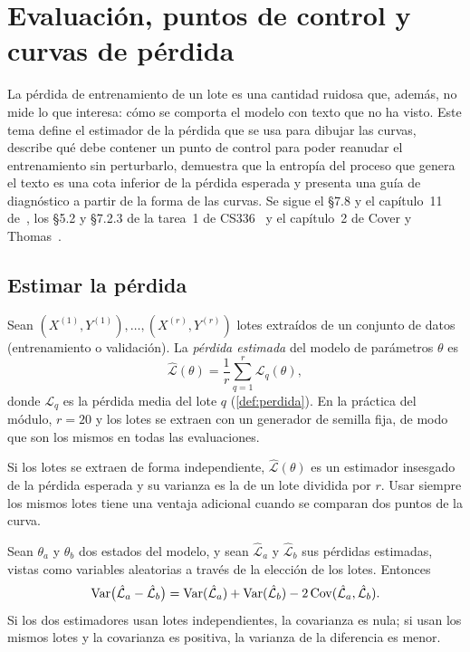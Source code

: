 \chapter{Evaluación, puntos de control y curvas de pérdida}
\label{tema:4}

La pérdida de entrenamiento de un lote es una cantidad ruidosa que, además, no mide lo que interesa: cómo se comporta el modelo con texto que no ha visto. Este tema define el estimador de la pérdida que se usa para dibujar las curvas, describe qué debe contener un punto de control para poder reanudar el entrenamiento sin perturbarlo, demuestra que la entropía del proceso que genera el texto es una cota inferior de la pérdida esperada y presenta una guía de diagnóstico a partir de la forma de las curvas. Se sigue el §7.8 y el capítulo~11 de~\cite{gbc}, los §5.2 y §7.2.3 de la tarea~1 de CS336~\cite{cs336} y el capítulo~2 de Cover y Thomas~\cite{ct}.

\section{Estimar la pérdida}

\begin{definicion}\label{def:estimada}
Sean $(X^{(1)},Y^{(1)}),\dots,(X^{(r)},Y^{(r)})$ lotes extraídos de un conjunto de datos (entrenamiento o validación). La \emph{pérdida estimada} del modelo de parámetros $\theta$ es
\[
\hat{\mathcal{L}}(\theta)=\frac1r\sum_{q=1}^{r}\mathcal{L}_q(\theta),
\]
donde $\mathcal{L}_q$ es la pérdida media del lote $q$ (\cref{def:perdida}). En la práctica del módulo, $r=20$ y los lotes se extraen con un generador de semilla fija, de modo que son los mismos en todas las evaluaciones.
\end{definicion}

Si los lotes se extraen de forma independiente, $\hat{\mathcal{L}}(\theta)$ es un estimador insesgado de la pérdida esperada y su varianza es la de un lote dividida por $r$. Usar siempre los mismos lotes tiene una ventaja adicional cuando se comparan dos puntos de la curva.

\begin{proposicion}\label{prop:lotes-comunes}
Sean $\theta_a$ y $\theta_b$ dos estados del modelo, y sean $\hat{\mathcal{L}}_a$ y $\hat{\mathcal{L}}_b$ sus pérdidas estimadas, vistas como variables aleatorias a través de la elección de los lotes. Entonces
\[
\operatorname{Var}\bigl(\hat{\mathcal{L}}_a-\hat{\mathcal{L}}_b\bigr)=\operatorname{Var}(\hat{\mathcal{L}}_a)+\operatorname{Var}(\hat{\mathcal{L}}_b)-2\operatorname{Cov}(\hat{\mathcal{L}}_a,\hat{\mathcal{L}}_b).
\]
Si los dos estimadores usan lotes independientes, la covarianza es nula; si usan los mismos lotes y la covarianza es positiva, la varianza de la diferencia es menor.
\end{proposicion}

